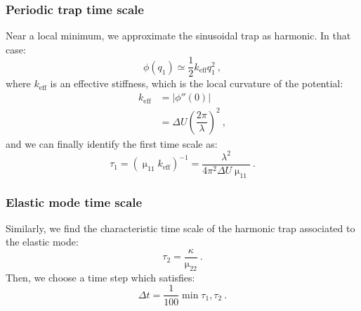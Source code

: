  \subsubsection{Periodic trap time scale}
Near a local minimum, we approximate the sinusoidal trap as harmonic. In that case:
\begin{equation}
    \phi(q_1) \simeq \dfrac{1}{2} k_\mathrm{eff}q_1^2~,
\end{equation}
where $k_\mathrm{eff}$ is an effective stiffness, which is the local curvature of the potential:
\begin{align}
k_\mathrm{eff} &= |\phi''(0)| \\
&= \Delta U \left( \dfrac{2 \pi}{\lambda} \right)^2~,
\end{align}
and we can finally identify the first time scale as:
\begin{equation}
    \boxed{
    \tau_1 = (\upmu_{11} k_\mathrm{eff})^{-1} = \dfrac{\lambda^2}{4 \pi^2 \Delta U \upmu_{11}}}~.
\end{equation}

\subsubsection{Elastic mode time scale}
Similarly, we find the characteristic time scale of the harmonic trap associated to the elastic mode:
\begin{equation}
    \boxed{
    \tau_2 = \dfrac{\kappa}{\upmu_{22}}}~.
\end{equation}
Then, we choose a time step which satisfies:
\begin{equation}
    \boxed{
    \Delta t = \dfrac{1}{100}\min{\tau_1, \tau_2}}~.
\end{equation}

